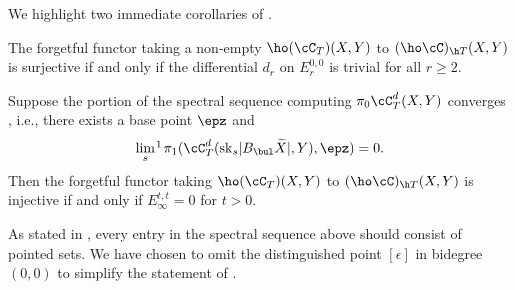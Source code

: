 \documentclass[leqno,oneside,english]{elsarticle}
\begin{document}
We highlight two immediate corollaries of .
\begin{cor}\label{cor:forget-full}
  The forgetful functor taking a non-empty $\ho(\cC_T)(X,Y)$ to
  $(\ho\cC)_{\h T}(X,Y)$ is surjective if and only if the differential
  $d_r$ on $E_r^{0,0}$ is trivial for all $r \ge 2$.
\end{cor}

\begin{cor}\label{cor:forget-faithful}

  Suppose the portion of the spectral sequence computing $\pi_0
  \cC_T^d(X,Y)$ converges \cite[\S~4.2]{Bou89}, i.e., there exists a base point $\epz$ and 
  \[
  \lim_s{\textstyle{\hspace{-1pt}^1\hspace{1pt}}} 
  \pi_{1}(\cC^{d}_{T}(\mathrm{sk}_s|B_{\bul}\widetilde{X}|, Y),\epz)=0.
  \]  
  Then the forgetful functor taking $\ho(\cC_T)(X,Y)$ to $(\ho\cC)_{\h
  T}(X,Y)$ is injective if and only if $E_\infty^{t,t} = 0$ for
  $t>0$.
\end{cor}

\begin{remark}
  As stated in \cite{Bou89}, every entry in the spectral sequence above
  should consist of pointed sets. We have chosen to omit the distinguished point
  $[\epsilon]$ in bidegree $(0,0)$ to simplify the statement
  of . 
\end{remark}
\end{document}
